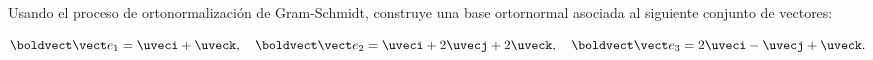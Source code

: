 \documentclass[../main.tex]{subfiles}
\begin{document}
\begin{problema}
	Usando el proceso de ortonormalización de Gram-Schmidt, construye una base
	ortornormal asociada al siguiente conjunto de vectores:

	\begin{equation*}
		\ev{1} = \uveci + \uveck,\quad
		\ev{2} = \uveci + 2\uvecj + 2\uveck,\quad
		\ev{3} = 2\uveci - \uvecj + \uveck.
	\end{equation*}
\end{problema}
\end{document}
